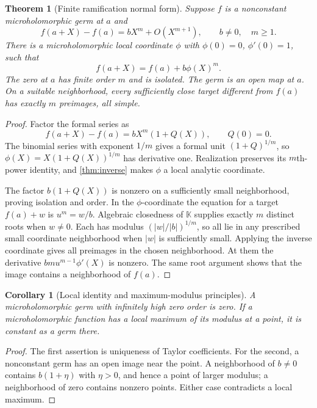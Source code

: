 \documentclass[11pt,letterpaper]{article}
\numberwithin{equation}{section}
\newtheorem{theorem}{Theorem}[section]
\newtheorem{corollary}[corollary]{Corollary}
\theoremstyle{definition}
\theoremstyle{remark}
\newcommand{\K}{\mathbb K}
\begin{document}
\begin{theorem}[Finite ramification normal form]\label{thm:ramification}
Suppose $f$ is a nonconstant microholomorphic germ at $a$ and
\[
 f(a+X)-f(a)=bX^m+O(X^{m+1}),\qquad b\ne0,\quad m\ge1.
\]
There is a microholomorphic local coordinate $\phi$ with
$\phi(0)=0$, $\phi'(0)=1$, such that
\begin{equation}\label{eq:ramification}
 f(a+X)=f(a)+b\phi(X)^m.
\end{equation}
The zero at $a$ has finite order $m$ and is isolated. The germ is an open
map at $a$. On a suitable neighborhood, every sufficiently close target
different from $f(a)$ has exactly $m$ preimages, all simple.
\end{theorem}
\begin{proof}
Factor the formal series as
\[
 f(a+X)-f(a)=bX^m(1+Q(X)),\qquad Q(0)=0.
\]
The binomial series with exponent $1/m$ gives a formal unit
$(1+Q)^{1/m}$, so $\phi(X)=X(1+Q(X))^{1/m}$ has derivative one.
Realization preserves its $m$th-power identity, and \cref{thm:inverse}
makes $\phi$ a local analytic coordinate.

The factor $b(1+Q(X))$ is nonzero on a sufficiently small neighborhood,
proving isolation and order. In the $\phi$-coordinate the equation for a
target $f(a)+w$ is $u^m=w/b$. Algebraic closedness of $\K$ supplies
exactly $m$ distinct roots when $w\ne0$. Each has modulus
$(|w|/|b|)^{1/m}$, so all lie in any prescribed small coordinate
neighborhood when $|w|$ is sufficiently small. Applying the inverse
coordinate gives all preimages in the chosen neighborhood. At them the
derivative $bm u^{m-1}\phi'(X)$ is nonzero. The same root argument shows
that the image contains a neighborhood of $f(a)$.
\end{proof}

\begin{corollary}[Local identity and maximum-modulus principles]
A microholomorphic germ with infinitely high zero order is zero. If a
microholomorphic function has a local maximum of its modulus at a point,
it is constant as a germ there.
\end{corollary}
\begin{proof}
The first assertion is uniqueness of Taylor coefficients. For the second,
a nonconstant germ has an open image near the point. A neighborhood of
$b\ne0$ contains $b(1+\eta)$ with $\eta>0$, and hence a point of larger
modulus; a neighborhood of zero contains nonzero points. Either case
contradicts a local maximum.
\end{proof}
\end{document}

